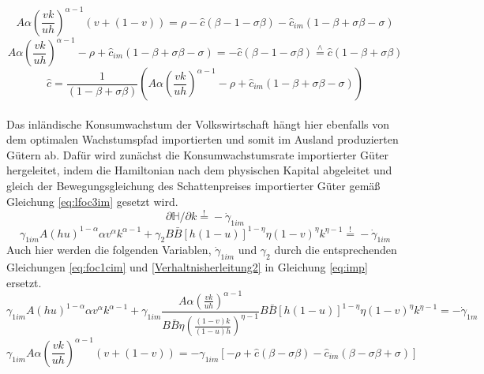 \begin{equation*}
A \alpha \left(\frac{vk}{uh}\right)^{\alpha -1}(v+(1-v))= \rho - \hat{c} (\beta -1 - \sigma \beta)-\hat{c}_{im}(1- \beta + \sigma \beta - \sigma)
\end{equation*}
\begin{equation*}
A \alpha \left(\frac{vk}{uh}\right)^{\alpha -1}- \rho +\hat{c}_{im}(1- \beta + \sigma \beta - \sigma)=- \hat{c}  (\beta -1 - \sigma \beta) \overset{\wedge}{=} \hat{c}(1- \beta+ \sigma \beta)
\end{equation*}
\begin{equation}
\boxed{
\hat{c}=\frac{1}{(1-\beta+\sigma\beta)}\left(A\alpha \left(\frac{vk}{uh}\right)^{\alpha -1}-\rho+\hat{c}_{im}(1-\beta+\sigma\beta-\sigma)\right)}\label{eq:lKRR}
\end{equation}
\\
Das inländische Konsumwachstum der Volkswirtschaft hängt hier ebenfalls von dem optimalen Wachstumspfad importierten und somit im Ausland produzierten Gütern ab. Dafür wird zunächst die Konsumwachstumsrate importierter Güter hergeleitet, indem die Hamiltonian nach dem physischen Kapital abgeleitet und gleich der Bewegungsgleichung des Schattenpreises importierter Güter gemä{\ss} Gleichung \eqref{eq:lfoc3im} gesetzt wird.\\
\begin{equation*}
\partial\mathbb{H}/\partial k\overset{!}{=}-\dot{\gamma}_{1im}
\end{equation*}
\begin{equation}
\gamma_{1 im}A(hu)^{1- \alpha}\alpha v^{\alpha} k^{\alpha -1} + \gamma_{2}B\bar{B} [h(1-u)]^{1- \eta} \eta(1-v)^{\eta}k^{\eta -1} \overset{!}{=} - \dot{\gamma}_{1im}\label{eq:imp}
\end{equation}
Auch hier werden die folgenden Variablen, $\dot{\gamma}_{1im}$ und $\gamma_2$ durch die entsprechenden Gleichungen \eqref{eq:foc1cim} und \eqref{Verhaltnisherleitung2} in Gleichung \eqref{eq:imp} ersetzt. 
\begin{equation*}
\gamma_{1im}A(hu)^{1- \alpha}\alpha v^{\alpha} k^{\alpha -1} +\gamma_{1im} \frac{A\alpha \left(\frac{vk}{uh}\right)^{\alpha-1}}{B\bar{B}\eta\left(\frac{(1-v)k}{(1-u)h}\right)^{\eta-1}} B\bar{B} [h(1-u)]^{1- \eta} \eta(1-v)^{\eta}k^{\eta -1} = - \dot{\gamma}_{1m}
\end{equation*}
\begin{equation*}
\gamma_{1im} A \alpha \left(\frac{vk}{uh}\right)^{\alpha -1} (v+(1-v)) = - \gamma_{1im} \left [ - \rho + \hat{c} (\beta - \sigma\beta) - \hat{c}_{im} (\beta-\sigma\beta+ \sigma) \right ]
\end{equation*}
